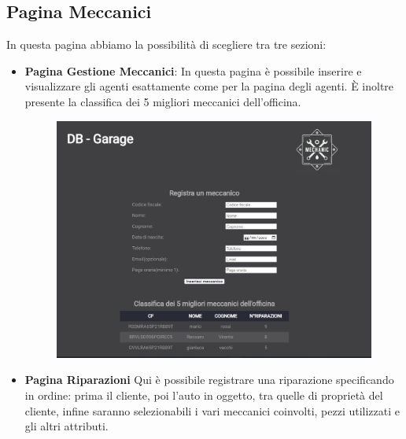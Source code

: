 \documentclass[a4paper,12pt]{report}
\begin{document}
\subsection*{Pagina Meccanici}
In questa pagina abbiamo la possibilità di scegliere tra tre sezioni:

\begin{itemize}
	\item \textbf{Pagina Gestione Meccanici}:
	In questa pagina è possibile inserire e visualizzare gli agenti esattamente come per la pagina degli agenti.
	È inoltre presente la classifica dei 5 migliori meccanici dell'officina.	
	\begin{figure}[H]
		\centering
		\includegraphics[scale=0.5]{img/meccanici.jpg}
	\end{figure}

	\item \textbf{Pagina Riparazioni}
	Qui è possibile registrare una riparazione specificando in ordine: prima il cliente, poi l'auto in oggetto, tra quelle 
	di proprietà del cliente, infine saranno selezionabili i vari meccanici coinvolti, pezzi utilizzati e gli altri attributi.
	

\end{itemize}
\end{document}
